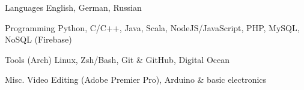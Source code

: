 

\begin{cvskills}

\cvskill
  {Languages} %
  {English, German, Russian} %

  \cvskill
    {Programming} %
    {Python, C/C++, Java, Scala, NodeJS/JavaScript, PHP, MySQL, NoSQL (Firebase)} %

  \cvskill
    {Tools} %
    {(Arch) Linux, Zsh/Bash, Git \& GitHub, Digital Ocean} %

  \cvskill
    {Misc.} %
    {Video Editing (Adobe Premier Pro), Arduino \& basic electronics} %

\end{cvskills}
